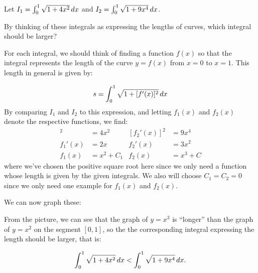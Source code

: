 \documentclass[]{ximera}
\begin{document}

\begin{problem}
Let $I_1 = \int_0^1 \sqrt{1+4x^2} \mathop{}\!d x$ and $I_2 = \int_0^1 \sqrt{1+9x^4} \mathop{}\!d x$.  

By thinking of these integrals as expressing the lengths of curves, which integral should be larger?
\end{problem}

\begin{freeResponse}
For each integral, we should think of finding a function $f(x)$ so that the integral represents the length of the curve $y=f(x)$ from $x=0$ to $x=1$.  This length in general is given by:

\[
s = \int_0^1 \sqrt{1+[f'(x)]^2} \mathop{}\!d x
\]
By comparing $I_1$ and $I_2$ to this expression, and letting $f_1(x)$ and $f_2(x)$ denote the respective functions, we find:
\begin{align*}
[f_1'(x)]^2 &= 4x^2 & [f_2'(x)]^2 &= 9x^4 \\
f_1'(x) &= 2x & f_2'(x) &= 3x^2 \\
f_1(x) &=x^2+C_1 & f_2(x) &=x^3+C 
\end{align*}
where we've chosen the positive square root here since we only need a function whose length is given by the given integrals.  We also will choose $C_1=C_2=0$ since we only need one example for $f_1(x)$ and $f_2(x)$.

We can now graph these:

\begin{image}
\end{image}

From the picture, we can see that the graph of $y=x^3$ is ``longer'' than the graph of $y=x^2$ on the segment $[0,1]$, so the the corresponding integral expressing the length should be larger, that is:

\[
 \int_0^1 \sqrt{1+4x^2} \mathop{}\!d x < \int_0^1 \sqrt{1+9x^4} \mathop{}\!d x.  
\]


\end{freeResponse}
\end{document}
